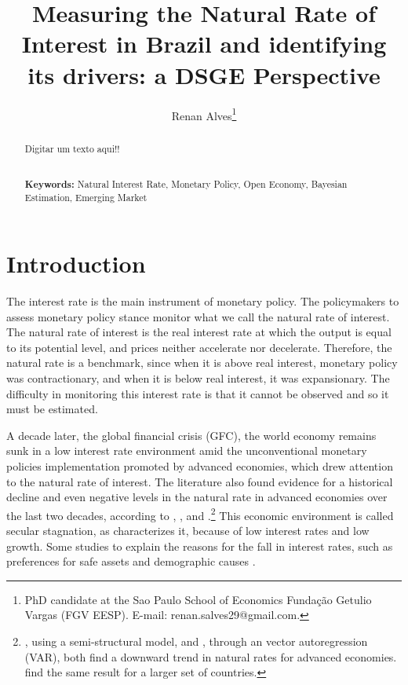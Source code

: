 \documentclass[12pt,oneside,a4paper]{article}
\title{Measuring the Natural Rate of Interest in Brazil and identifying its drivers: a DSGE Perspective}
\author{ Renan Alves\thanks{PhD candidate at the Sao Paulo School of Economics Fundação Getulio Vargas (FGV EESP). E-mail:  renan.salves29@gmail.com.}}
\date{}
\begin{document}
\maketitle


\begin{abstract}
   Digitar um texto aqui!!

	\noindent
	\\
	\textbf{Keywords:} Natural Interest Rate, Monetary Policy, Open Economy, Bayesian Estimation, Emerging Market
	
\end{abstract}

\onehalfspacing
%
%
\newpage
%
%
\section{Introduction}
The interest rate is the main instrument of monetary policy. The policymakers to assess monetary policy stance monitor what we call the natural rate of interest. The natural rate of interest  is the real interest rate at which the output is equal to its potential level, and prices neither accelerate nor decelerate. Therefore, the natural rate is a benchmark, since when it is above real interest, monetary policy was contractionary, and when it is below real interest, it was expansionary. The difficulty in monitoring this interest rate is that it cannot be observed and so it must be estimated. 

A decade later, the global financial crisis (GFC), the world economy remains sunk in a low interest rate environment amid the unconventional monetary policies implementation promoted by advanced economies, which drew attention to the natural rate of interest. The literature also found evidence for a historical decline and even negative levels in the natural rate in advanced economies over the last two decades, according to \citet{HLW:2017}, \citet{Wynne:2018}, and \citet{DelNegro:2019}.\footnote{\citet{HLW:2017}, using a semi-structural model, and \citet{DelNegro:2019}, through an vector autoregression (VAR), both find a downward trend in natural rates for advanced economies. \citet{Wynneb:2018} find the same result for a larger set of countries. }  
This economic environment is called secular stagnation, as \citet{Summers:2014} characterizes it, because of low interest rates and low growth. Some studies to explain the reasons for the fall in interest rates, such as preferences for safe assets \citet{Caballero:2017} and demographic causes \citet{Eggertsson:2019}.
\end{document}
